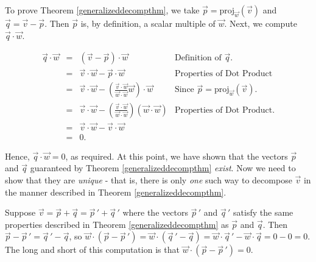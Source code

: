 \documentclass{ximera}
\begin{document}
 

To prove Theorem \ref{generalizeddecompthm}, we take  $\overrightarrow{p} = \text{proj}_{\overrightarrow{w}}(\overrightarrow{v})$ and $\overrightarrow{q} = \overrightarrow{v} - \overrightarrow{p}$.  Then  $\overrightarrow{p}$ is, by definition, a scalar multiple of $\overrightarrow{w}$.  Next, we compute $\overrightarrow{q} \cdot \overrightarrow{w}$.

\[ \begin{array}{rcll}

\overrightarrow{q} \cdot \overrightarrow{w} & = & (\overrightarrow{v} - \overrightarrow{p}) \cdot \overrightarrow{w}& \text{Definition of $\overrightarrow{q}$.} \\ 
& = & \overrightarrow{v} \cdot \overrightarrow{w} - \overrightarrow{p} \cdot \overrightarrow{w} & \text{Properties of Dot Product} \\  
& = & \overrightarrow{v} \cdot \overrightarrow{w} - \left(\frac{\overrightarrow{v} \cdot \overrightarrow{w}}{\overrightarrow{w} \cdot \overrightarrow{w}} \overrightarrow{w}\right) \cdot \overrightarrow{w} & \text{Since $\overrightarrow{p} = \text{proj}_{\overrightarrow{w}}(\overrightarrow{v})$.} \\  
& = & \overrightarrow{v} \cdot \overrightarrow{w} - \left(\frac{\overrightarrow{v} \cdot \overrightarrow{w}}{\overrightarrow{w} \cdot \overrightarrow{w}}\right) (\overrightarrow{w} \cdot \overrightarrow{w}) & \text{Properties of Dot Product.} \\  
& = & \overrightarrow{v} \cdot \overrightarrow{w} - \overrightarrow{v}\cdot \overrightarrow{w} & \\ 
& = & 0. & \end{array} \]
											
Hence, $\overrightarrow{q} \cdot \overrightarrow{w} = 0$, as required.  At this point, we have shown that the vectors $\overrightarrow{p}$ and $\overrightarrow{q}$ guaranteed by Theorem \ref{generalizeddecompthm} \textit{exist}.  Now we need to show that they are \textit{unique} - that is, there is only \textit{one} such way to decompose $\overrightarrow{v}$ in the manner described in  Theorem \ref{generalizeddecompthm}.

Suppose $\overrightarrow{v} = \overrightarrow{p} + \overrightarrow{q} = \overrightarrow{p} \,' + \overrightarrow{q} \,'$ where the vectors $\overrightarrow{p} \,'$ and $\overrightarrow{q} \,'$ satisfy the same properties described in  Theorem \ref{generalizeddecompthm} as $\overrightarrow{p}$ and $\overrightarrow{q}$.  Then $\overrightarrow{p} - \overrightarrow{p} \,' = \overrightarrow{q} \,' - \overrightarrow{q}$, so $\overrightarrow{w} \cdot (\overrightarrow{p} - \overrightarrow{p} \,') = \overrightarrow{w} \cdot (\overrightarrow{q} \,' - \overrightarrow{q}) = \overrightarrow{w} \cdot \overrightarrow{q} \,' - \overrightarrow{w} \cdot \overrightarrow{q} = 0 - 0 = 0$.  The long and short of this computation is that $\overrightarrow{w} \cdot (\overrightarrow{p} - \overrightarrow{p} \,') = 0$. 
\end{document}
